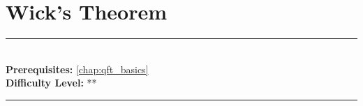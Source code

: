 \documentclass[book.tex]{subfiles}
\begin{document}
\chapter{Wick's Theorem}

\label{chap:wicks_theorem}
\noindent\rule{11cm}{0.4pt} \\
\textbf{Prerequisites:} \autoref{chap:qft_basics}  \\
\textbf{Difficulty Level:} ** \\
\noindent\rule{11cm}{0.4pt}
\vspace{5mm}



\end{document}
